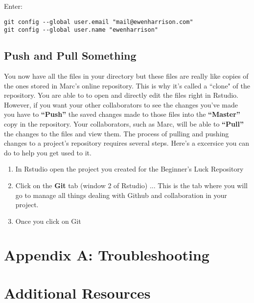 \documentclass{article}\usepackage[]{graphicx}\usepackage[]{color}
\begin{document}
\noindent Enter:

\begin{verbatim}
git config --global user.email "mail@ewenharrison.com"
git config --global user.name "ewenharrison"
\end{verbatim}

  \subsection*{Push and Pull Something}
  You now have all the files in your directory but these files are really like copies of the ones stored in Marc's online repository. This is why it's called a ``clone" of the repository. You are able to to open and directly edit the files right in Rstudio. However, if you want your other collaborators to see the changes you've made you have to \textbf{``Push''} the saved changes made to those files into the \textbf{``Master''} copy in the repository. Your collaborators, such as Marc, will be able to \textbf{``Pull''} the changes to the files and view them. The process of pulling and pushing changes to a project's repository requires several steps. Here's a excersice you can do to help you get used to it. 
  \begin{enumerate}
  \item In Rstudio open the project you created for the Beginner's Luck Repository 
  \item Click on the \textbf{Git} tab (window 2 of Rstudio) ... This is the tab where you will go to manage all things dealing with Github and collaboration in your project.
  \item Once you click on Git
  \end{enumerate}
\section{Appendix A: Troubleshooting}


\section{Additional Resources}
\end{document}
